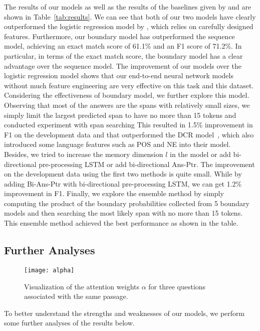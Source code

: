 \documentclass{article} \usepackage{iclr2017_conference,times}
\begin{document}
The results of our models as well as the results of the baselines given by \citet{rajpurkar2016squad} and \citet{Yu2015rank:arxiv} are shown in Table~\ref{tab:results}.
We can see that both of our two models have clearly outperformed the logistic regression model by \citet{rajpurkar2016squad}, which relies on carefully designed features.
Furthermore, our boundary model has outperformed the sequence model, achieving an exact match score of 61.1\% and an F1 score of 71.2\%. 
In particular, in terms of the exact match score, the boundary model has a clear advantage over the sequence model.
The improvement of our models over the logistic regression model shows that our end-to-end neural network models without much feature engineering are very effective on this task and this dataset.
Considering the effectiveness of boundary model, we further explore this model. 
Observing that most of the answers are the spans with relatively small sizes, we simply limit the largest predicted span to have no more than 15 tokens and conducted experiment with span searching
This resulted in 1.5\% improvement in F1 on the development data and that outperformed the DCR model~\citep{Yu2015rank:arxiv}, which also introduced some language features such as POS and NE into their model. 
Besides, we tried to increase the memory dimension $l$ in the model or add bi-directional pre-processing LSTM or add bi-directional Ans-Ptr. 
The improvement on the development data using the first two methods is quite small. 
While by adding Bi-Ans-Ptr with bi-directional pre-processing LSTM, we can get 1.2\% improvement in F1. 
Finally, we explore the ensemble method by simply computing the product of the boundary probabilities collected from 5 boundary models and then searching the most likely span with no more than 15 tokens.
This ensemble method achieved the best performance as shown in the table.

\subsection{Further Analyses}


\begin{figure}[]
	\centering
	\texttt{[image: alpha]}
	\caption{Visualization of the attention weights $\alpha$ for three questions associated with the same passage.  }
	\label{fig:alpha}
\end{figure}		

To better understand the strengths and weaknesses of our models, we perform some further analyses of the results below.
\end{document}
